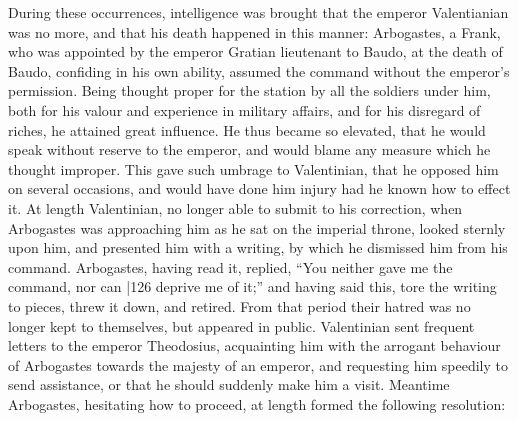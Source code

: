 During these occurrences, intelligence was brought that the emperor
Valentianian was no more, and that his death happened in this manner:
Arbogastes, a Frank, who was appointed by the emperor Gratian lieutenant to
Baudo, at the death of Baudo, confiding in his own ability, assumed the command
without the emperor's permission. Being thought proper for the station by
all the soldiers under him, both for his valour and experience in military
affairs, and for his disregard of riches, he attained great influence. He
thus became so elevated, that he would speak without reserve to the emperor, and
would blame any measure which he thought improper. This gave such umbrage
to Valentinian, that he opposed him on several occasions, and would have done
him injury had he known how to effect it. At length Valentinian, no
longer able to submit to his correction, when Arbogastes was approaching him as
he sat on the imperial throne, looked sternly upon him, and presented him with a
writing, by which he dismissed him from his command. Arbogastes, having
read it, replied, ``You neither gave me the command, nor can |126 deprive me of it;'' and having said this, tore the writing to pieces, threw it down, and retired. From that period their hatred was no longer kept to themselves, but appeared in public. Valentinian sent frequent letters to the emperor Theodosius, acquainting him with the arrogant behaviour of Arbogastes towards the majesty of an emperor, and requesting him speedily to send assistance, or that he should suddenly make him a visit. Meantime Arbogastes, hesitating how to proceed, at length formed the following resolution:

